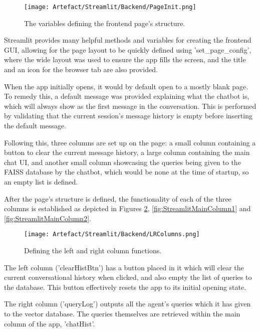 \begin{figure}[H]
    \centering
    \texttt{[image: Artefact/Streamlit/Backend/PageInit.png]}
    \caption{The variables defining the frontend page's structure. \label{fig:StreamlitInitPage}}
\end{figure}

\noindent Streamlit provides many helpful methods and variables for creating the frontend GUI, allowing for the page layout to be 
quickly defined using 'set\_page\_config', where the wide layout was used to ensure the app fills the screen, and the title and an icon 
for the browser tab are also provided. 

\para When the app initially opens, it would by default open to a mostly blank page. To remedy this, a default message was provided 
explaining what the chatbot is, which will always show as the first message in the conversation. This is performed by validating that 
the current session's message history is empty before inserting the default message.

\para Following this, three columns are set up on the page: a small column containing a button to clear the current message history,
a large column containing the main chat UI, and another small column showcasing the queries being given to the FAISS database by the 
chatbot, which would be none at the time of startup, so an empty list is defined.

\para After the page's structure is defined, the functionality of each of the three columns is established as depicted in Figures \ref{fig:StreamlitLRColumns}, \ref{fig:StreamlitMainColumn1} and \ref{fig:StreamlitMainColumn2}.

\begin{figure}[H]
    \centering
    \texttt{[image: Artefact/Streamlit/Backend/LRColumns.png]}
    \caption{Defining the left and right column functions. \label{fig:StreamlitLRColumns}}
\end{figure}

\noindent The left column ('clearHistBtn') has a button placed in it which will clear the current conversational history when clicked,
and also empty the list of queries to the database. This button effectively resets the app to its initial opening state.

\para The right column ('queryLog') outputs all the agent's queries which it has given to the vector database. The queries themselves are 
retrieved within the main column of the app, 'chatHist'.

